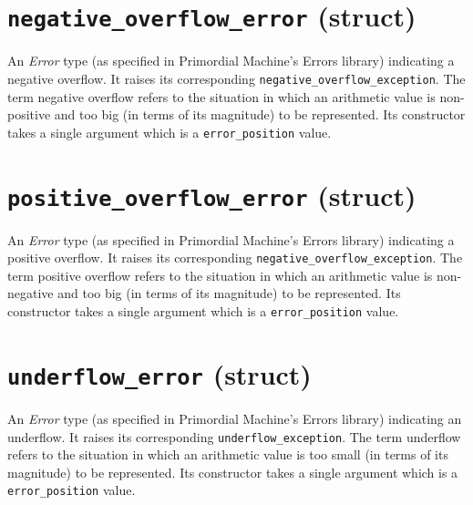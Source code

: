 \documentclass[oneside]{book}
\begin{document}
\section{\texttt{negative\_overflow\_error} (struct)}
An \textit{Error} type (as specified in Primordial Machine's Errors library) indicating a negative overflow.
It raises its corresponding \texttt{negative\_overflow\_exception}.
The term negative overflow refers to the situation in which an arithmetic value is non-positive and
too big (in terms of its magnitude) to be represented. Its constructor takes a single argument which
is a \texttt{error\_position} value.

\section{\texttt{positive\_overflow\_error} (struct)}
An \textit{Error} type (as specified in Primordial Machine's Errors library) indicating a positive overflow.
It raises its corresponding \texttt{negative\_overflow\_exception}.
The term positive overflow refers to the situation in which an arithmetic value is non-negative and
too big (in terms of its magnitude) to be represented. Its constructor takes a single argument which
is a \texttt{error\_position} value.

\section{\texttt{underflow\_error} (struct)}
An \textit{Error} type (as specified in Primordial Machine's Errors library) indicating an underflow.
It raises its corresponding \texttt{underflow\_exception}.
The term underflow refers to the situation in which an arithmetic value is too small (in terms of
its magnitude) to be represented. Its constructor takes a single argument which
is a \texttt{error\_position} value.
\end{document}
